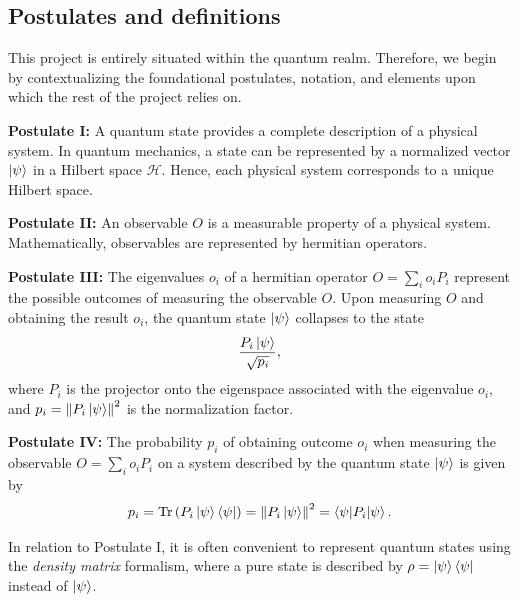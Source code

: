 \documentclass[12pt,letterpaper]{article}
\begin{document}
\subsection{Postulates and definitions}

\hspace{20pt}This project is entirely situated within the quantum realm. Therefore, we begin by contextualizing the foundational postulates, notation, and elements upon which the rest of the project relies on.

\textbf{Postulate I:} A quantum state provides a complete description of a physical system. In quantum mechanics, a state can be represented by a normalized vector $\ket{\psi}$ in a Hilbert space $\mathcal{H}$. Hence, each physical system corresponds to a unique Hilbert space.

\textbf{Postulate II:} An observable $O$ is a measurable property of a physical system. Mathematically, observables are represented by hermitian operators.

\textbf{Postulate III:} The eigenvalues $o_i$ of a hermitian operator $O = \sum_{i} o_i P_i$ represent the possible outcomes of measuring the observable $O$. Upon measuring $O$ and obtaining the result $o_i$, the quantum state $\ket{\psi}$ collapses to the state
\begin{align*}
	\frac{P_i\ket{\psi}}{\sqrt{p_i}},
\end{align*}
where $P_i$ is the projector onto the eigenspace associated with the eigenvalue $o_i$, and $p_i = \left\|P_i\ket{\psi}\right\|^2$ is the normalization factor.

\textbf{Postulate IV:} The probability $p_i$ of obtaining outcome $o_i$ when measuring the observable $O = \sum_{i} o_i P_i$ on a system described by the quantum state $\ket{\psi}$ is given by
\begin{align*}
	p_i = \text{Tr}\left(P_i \ket{\psi}\bra{\psi}\right) = \left\|P_i\ket{\psi}\right\|^2 = \braket{\psi|P_i|\psi}.
\end{align*}


In relation to Postulate I, it is often convenient to represent quantum states using the \emph{density matrix} formalism, where a pure  state is described by $\rho = \ket{\psi}\bra{\psi}$ instead of $\ket{\psi}$. 
\end{document}
